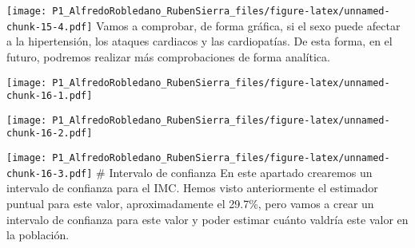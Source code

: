 \documentclass[
]{article}
\newenvironment{Shaded}{\begin{snugshade}}{\end{snugshade}}
\newcommand{\AttributeTok}[1]{\textcolor[rgb]{0.77,0.63,0.00}{#1}}
\newcommand{\FunctionTok}[1]{\textcolor[rgb]{0.00,0.00,0.00}{#1}}
\newcommand{\NormalTok}[1]{#1}
\newcommand{\SpecialCharTok}[1]{\textcolor[rgb]{0.00,0.00,0.00}{#1}}
\newcommand{\StringTok}[1]{\textcolor[rgb]{0.31,0.60,0.02}{#1}}
\begin{document}
\texttt{[image: P1\_AlfredoRobledano\_RubenSierra\_files/figure-latex/unnamed-chunk-15-4.pdf]}
Vamos a comprobar, de forma gráfica, si el sexo puede afectar a la
hipertensión, los ataques cardiacos y las cardiopatías. De esta forma,
en el futuro, podremos realizar más comprobaciones de forma analítica.

\begin{Shaded}
\end{Shaded}

\texttt{[image: P1\_AlfredoRobledano\_RubenSierra\_files/figure-latex/unnamed-chunk-16-1.pdf]}

\begin{Shaded}
\end{Shaded}

\texttt{[image: P1\_AlfredoRobledano\_RubenSierra\_files/figure-latex/unnamed-chunk-16-2.pdf]}

\begin{Shaded}
\end{Shaded}

\texttt{[image: P1\_AlfredoRobledano\_RubenSierra\_files/figure-latex/unnamed-chunk-16-3.pdf]}
\# Intervalo de confianza En este apartado crearemos un intervalo de
confianza para el IMC. Hemos visto anteriormente el estimador puntual
para este valor, aproximadamente el 29.7\%, pero vamos a crear un
intervalo de confianza para este valor y poder estimar cuánto valdría
este valor en la población.
\end{document}
